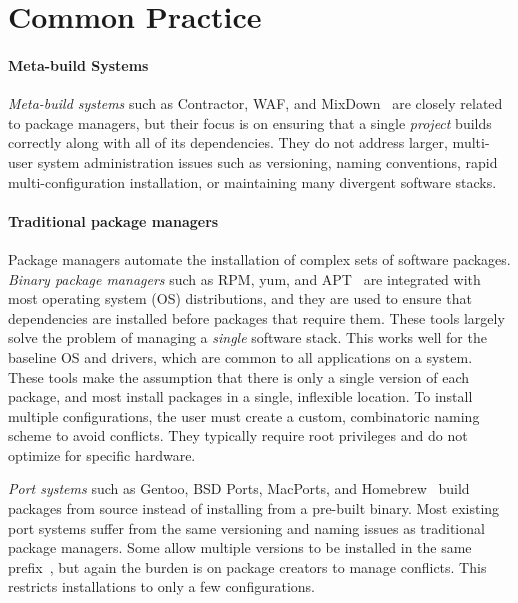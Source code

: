 
\section{Common Practice}
\label{sec:motivation}

\paragraph{Meta-build Systems}
{\it Meta-build systems} such as Contractor, WAF, and
MixDown~\cite{amundson:contractor,epperly+:mixdown,nagy:waf} are closely
related to package managers, but their focus is on ensuring that a single
{\it project} builds correctly along with all of its dependencies.  They do not address
larger, multi-user system administration issues such as versioning, naming
conventions, rapid multi-configuration installation, or maintaining many
divergent software stacks.

\paragraph{Traditional package managers}
Package managers automate the installation of complex sets of software packages.
{\it Binary package managers} such as RPM, yum, and  
APT~\cite{foster+:rpm03,silva:apt01,yum} are integrated with most
operating system (OS) distributions, and they are used to ensure that dependencies
are installed before packages that require them.
These tools largely solve the problem of managing a {\it single} software
stack.  This works well for the baseline OS and drivers, which are 
common to all applications on a system.
These tools make the assumption that there is only a single version
of each package, and most install packages in a single, inflexible location.
To install multiple configurations, the user must create a custom, combinatoric
naming scheme to avoid conflicts. They typically require root 
privileges and do not optimize for specific hardware.

{\it Port systems} such as Gentoo, BSD Ports, MacPorts, and 
Homebrew~\cite{bsdports,groffen:gentoo-prefix,homebrew,macports,thiruvathukal:gentoo04}
build packages from source instead of installing from a pre-built binary.
Most existing port systems suffer from 
the same versioning and naming issues as traditional package managers.
Some allow multiple versions to be installed in the same
prefix~\cite{groffen:gentoo-prefix}, but again the burden is on package
creators to manage conflicts. This restricts installations to only a few
configurations.


